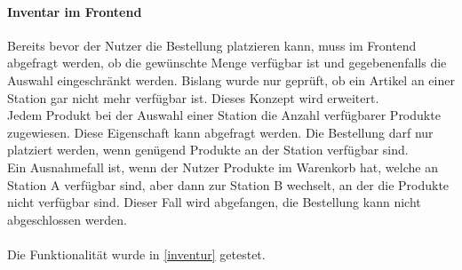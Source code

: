 \paragraph{Inventar im Frontend}
Bereits bevor der Nutzer die Bestellung platzieren kann, muss im Frontend abgefragt werden, ob die gewünschte Menge verfügbar ist und gegebenenfalls die Auswahl eingeschränkt werden. Bislang wurde nur geprüft, ob ein Artikel an einer Station gar nicht mehr verfügbar ist. Dieses Konzept wird erweitert. \\
Jedem Produkt bei der Auswahl einer Station die Anzahl verfügbarer Produkte zugewiesen. Diese Eigenschaft kann abgefragt werden. Die Bestellung darf nur platziert werden, wenn genügend Produkte an der Station verfügbar sind. \\
Ein Ausnahmefall ist, wenn der Nutzer Produkte im Warenkorb hat, welche an Station A verfügbar sind, aber dann zur Station B wechselt, an der die Produkte nicht verfügbar sind. Dieser Fall wird abgefangen, die Bestellung kann nicht abgeschlossen werden. \\\\
Die Funktionalität wurde in \ref{inventur} getestet. 	 
\newpage
